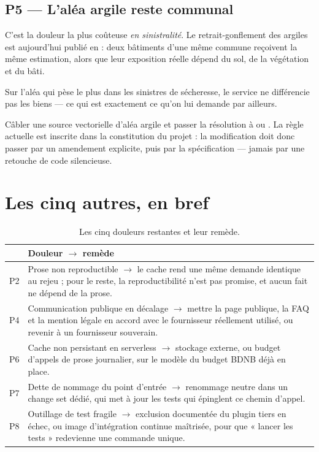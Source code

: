 \subsection{P5 — L'aléa argile reste communal}

C'est la douleur la plus coûteuse \emph{en sinistralité}. Le retrait-gonflement
des argiles est aujourd'hui publié en  : deux
bâtiments d'une même commune reçoivent la même estimation, alors que leur
exposition réelle dépend du sol, de la végétation et du bâti.

\begin{douleur}[title={Douleur}]
Sur l'aléa qui pèse le plus dans les sinistres de sécheresse, le service ne
différencie pas les biens — ce qui est exactement ce qu'on lui demande par
ailleurs.
\end{douleur}

\begin{remede}[title={Remède proposé}]
Câbler une source vectorielle d'aléa argile et passer la résolution à
 ou . La règle actuelle est inscrite
dans la constitution du projet : la modification doit donc passer par un
amendement explicite, puis par la spécification — jamais par une retouche de
code silencieuse.
\end{remede}

\section{Les cinq autres, en bref}

\begin{table}[h]
\centering
\small
\begin{tabularx}{\textwidth}{@{}p{1.1cm}X@{}}
\toprule
\textbf{} & \textbf{Douleur \(\rightarrow\) remède} \\
\midrule
P2 & Prose non reproductible \(\rightarrow\) le cache rend une même demande
  identique au rejeu ; pour le reste, la reproductibilité n'est pas promise, et
  aucun fait ne dépend de la prose. \\
P4 & Communication publique en décalage \(\rightarrow\) mettre la page publique,
  la FAQ et la mention légale en accord avec le fournisseur réellement utilisé,
  ou revenir à un fournisseur souverain. \\
P6 & Cache non persistant en serverless \(\rightarrow\) stockage externe, ou
  budget d'appels de prose journalier, sur le modèle du budget BDNB déjà en
  place. \\
P7 & Dette de nommage du point d'entrée \(\rightarrow\) renommage neutre dans un
  change set dédié, qui met à jour les tests qui épinglent ce chemin d'appel. \\
P8 & Outillage de test fragile \(\rightarrow\) exclusion documentée du plugin
  tiers en échec, ou image d'intégration continue maîtrisée, pour que
  « lancer les tests » redevienne une commande unique. \\
\bottomrule
\end{tabularx}
\caption{Les cinq douleurs restantes et leur remède.}
\end{table}

